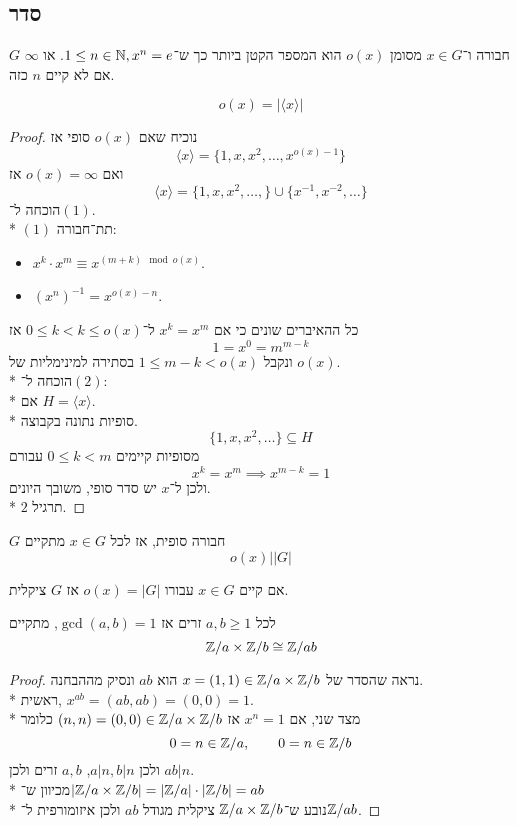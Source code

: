 \subsection{סדר}
\begin{definition}
	$G$ חבורה ו־$x \in G$ מסומן $o(x)$ הוא המספר הקטן ביותר כך ש־$1 \le n \in \mathbb{N}, x^n = e$. או $\infty$ אם לא קיים $n$ כזה.
\end{definition}
\begin{lemma}[סדר]
	\[
		o(x) = | \langle x\rangle|
	\]
\end{lemma}
\begin{proof}
	נוכיח שאם $o(x)$ סופי אז
	\[
		\langle x \rangle = \{ 1, x, x^2, \hdots, x^{o(x) - 1} \} \tag{1}
	\]
	ואם $o(x) = \infty$ אז
	\[
		\langle x \rangle = \{ 1, x, x^2, \hdots, \} \cup \{ x^{-1}, x^{-2}, \hdots \} \tag{2}
	\]
	הוכחה ל־$(1)$. \\*
	$(1)$ תת־חבורה:
	\begin{itemize}
		\item $x^k \cdot x^m \equiv x^{(m + k) \mod o(x)}$.
		\item ${(x^n)}^{-1} = x^{o(x) - n}$.
	\end{itemize}
	כל ההאיברים שונים כי אם $x^k = x^m$ ל־$0 \le k < k \le o(x)$ אז
	\[
		1 = x^0 = m^{m - k}
	\]
	ונקבל $1 \le m - k < o(x)$ בסתירה למינימליות של $o(x)$. \\*
	הוכחה ל־$(2)$: \\*
	אם $H = \langle x \rangle$. \\*
	סופיות נתונה בקבוצה.
	\[
		\{1, x, x^2, \hdots \} \subseteq H
	\]
	מסופיות קיימים $0 \le k < m$ עבורם
	\[
		x^k = x^m \implies x^{m - k} = 1
	\]
	ולכן ל־$x$ יש סדר סופי, משובך היונים. \\*
	$2$ תרגיל.
\end{proof}
\begin{conclusion}
	$G$ חבורה סופית, אז לכל $x \in G$ מתקיים
	\[
		o(x) \Big| |G|
	\]
\end{conclusion}
\begin{conclusion}
	אם קיים $x \in G$ עבורו $o(x) = |G|$ אז $G$ ציקלית.
\end{conclusion}

\begin{proposition}
	לכל $a, b \ge 1$ זרים אז $\gcd(a, b) = 1$, מתקיים
	\[
		\mathbb{Z}/a \times \mathbb{Z}/b \cong \mathbb{Z}/ab
	\]
\end{proposition}
\begin{proof}
	נראה שהסדר של $x = (1, 1) \in \mathbb{Z}/a \times \mathbb{Z}/b$ הוא $ab$ ונסיק מההבחנה. \\*
	ראשית, $x^{ab} = (ab, ab) = (0, 0) = 1$. \\*
	מצד שני, אם $x^n = 1$ אז $(n, n) = (0, 0) \in \mathbb{Z}/a \times \mathbb{Z}/b$ כלומר
	\[
		0 = n \in \mathbb{Z}/a, \qquad 0 = n \in \mathbb{Z}/b
	\]
	ולכן $a | n, b | n$, $a, b$ זרים ולכן $ab | n$. \\*
	מכיוון ש־$|\mathbb{Z}/a \times \mathbb{Z}/b| = |\mathbb{Z}/a| \cdot |\mathbb{Z}/b| = ab$ \\*
	נובע ש־$\mathbb{Z}/a \times \mathbb{Z}/b$ ציקלית מגודל $ab$ ולכן איזומורפית ל־$\mathbb{Z}/ab$.
\end{proof}


